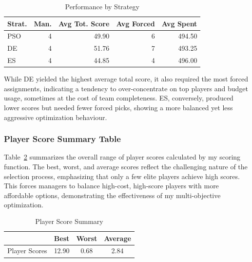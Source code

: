 \documentclass[sigconf]{acmart}
\begin{document}
\begin{table}[H]
	\centering
	\caption{Performance by Strategy}
	\label{tab:performance_by_strategy}
	\begin{tabular}{lrrrr}
		\toprule
		\textbf{Strat.} & \textbf{Man.} & \textbf{Avg Tot. Score} & \textbf{Avg Forced} & \textbf{Avg Spent} \\
		\midrule
		PSO & 4 & 49.90 & 6 & 494.50 \\
		DE  & 4 & 51.76 & 7 & 493.25 \\
		ES  & 4 & 44.85 & 4 & 496.00 \\
		\bottomrule
	\end{tabular}
\end{table}

While DE yielded the highest average total score, it also required the most forced assignments, indicating a tendency to over-concentrate on top players and budget usage, sometimes at the cost of team completeness. ES, conversely, produced lower scores but needed fewer forced picks, showing a more balanced yet less aggressive optimization behaviour.

\subsubsection{Player Score Summary Table}
Table~\ref{tab:player_summary} summarizes the overall range of player scores calculated by my scoring function. The best, worst, and average scores reflect the challenging nature of the selection process, emphasizing that only a few elite players achieve high scores. This forces managers to balance high-cost, high-score players with more affordable options, demonstrating the effectiveness of my multi-objective optimization.

\begin{table}[H]
	\centering
	\caption{Player Score Summary}
	\label{tab:player_summary}
	\begin{tabular}{lccc}
		\toprule
		& \textbf{Best} & \textbf{Worst} & \textbf{Average} \\
		\midrule
		Player Scores & 12.90 & 0.68 & 2.84 \\
		\bottomrule
	\end{tabular}
\end{table}
\end{document}
